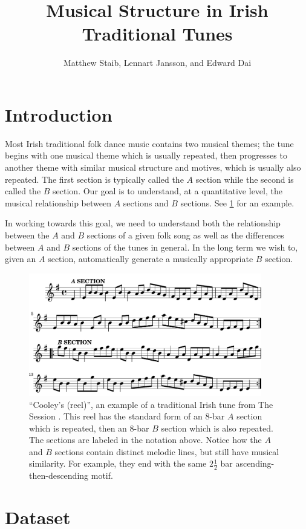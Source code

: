 \documentclass{article} %
\title{Musical Structure in Irish Traditional Tunes}
\author{Matthew Staib, Lennart Jansson, and Edward Dai}
\begin{document}
\suppressfloats
\maketitle

\section{Introduction}
Most Irish traditional folk dance music contains two musical themes; the tune
begins with one musical theme which is usually repeated, then progresses to
another theme with similar musical structure and motives, which is usually also
repeated. The first section is typically called the $A$ section while the second
is called the $B$ section. Our goal is to understand, at a quantitative level,
the musical relationship between $A$ sections and $B$ sections. See
\cref{origtune} for an example.

In working towards this goal, we need to understand both the relationship
between the $A$ and $B$ sections of a given folk song as well as the differences
between $A$ and $B$ sections of the tunes in general. In the long term we wish
to, given an $A$ section, automatically generate a musically appropriate $B$
section.

\begin{figure}
  \centering \includegraphics[width=4in]{original_tune-crop.pdf}
  \caption{
    ``Cooley's (reel)'', an example of a traditional Irish tune from The
    Session \cite{thesession}. This reel has the standard form of an 8-bar $A$
    section which is repeated, then an 8-bar $B$ section which is also repeated.
    The sections are labeled in the notation above. Notice how the $A$ and $B$
    sections contain distinct melodic lines, but still have musical similarity.
    For example, they end with the same $2 \frac 1 2$ bar
    ascending-then-descending motif.
  }
  \label{origtune}
\end{figure}

\section{Dataset}
\end{document}
